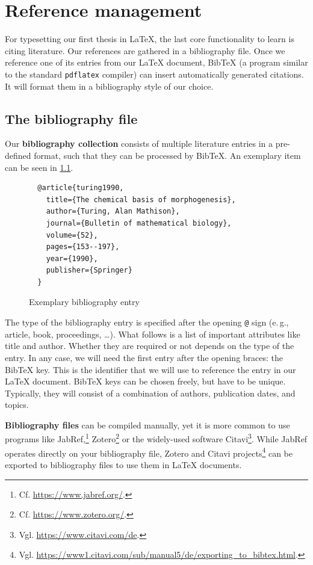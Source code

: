 \chapter{Reference management}
\label{sec:literature}

For typesetting our first thesis in \LaTeX{}, the last core functionality to learn is citing literature.
Our references are gathered in a bibliography file.
Once we reference one of its entries from our \LaTeX{} document, Bib\TeX{} (a 
program similar to the standard \texttt{pdflatex} compiler)
can insert automatically generated citations.
It will format them in a bibliography style of our choice.

\section{The bibliography file}
Our \textbf{bibliography collection} consists of multiple literature entries in a pre-defined format, such that they can be processed by Bib\TeX{}.
An exemplary item can be seen in \cref{lst:bibfile-sample-entry}.

\begin{figure}[H]
  \begin{verbatim}
  @article{turing1990,
    title={The chemical basis of morphogenesis},
    author={Turing, Alan Mathison},
    journal={Bulletin of mathematical biology},
    volume={52},
    pages={153--197},
    year={1990},
    publisher={Springer}
  }
  \end{verbatim}
  \caption{Exemplary bibliography entry}
  \label{lst:bibfile-sample-entry}
\end{figure}

The type of the bibliography entry is specified after the opening \texttt{@} sign (e.\,g., article, book, proceedings, …).
What follows is a list of important attributes like title and author.
Whether they are required or not depends on the type of the entry.
In any case, we will need the first entry after the opening braces: the Bib\TeX{} key.
This is the identifier that we will use to reference the entry in our \LaTeX{} document.
Bib\TeX{} keys can be chosen freely, but have to be unique.
Typically, they will consist of a combination of authors, publication dates, and topics.

\textbf{Bibliography files} can be compiled manually, yet it is more common to use programs like JabRef,\footnote{Cf. \url{https://www.jabref.org/}.} Zotero\footnote{Cf. \url{https://www.zotero.org/}.} or the widely-used software Citavi\footnote{Vgl. \url{https://www.citavi.com/de}.}.
While JabRef operates directly on your bibliography file, Zotero and Citavi projects\footnote{Vgl. \url{https://www1.citavi.com/sub/manual5/de/exporting_to_bibtex.html}.} can be exported to bibliography files to use them in \LaTeX{} documents.

